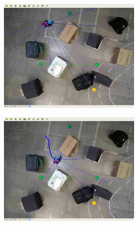 \vspace{0.25cm}
\begin{figure}[H]
\caption{Imagens sequência do experimento no Turtlebot3 no segundo ambiente real}
    \begin{center}
    \begin{subfigure}[b]{0.60\textwidth}
        \begin{subfigure}[b]{0.24\textwidth}
            \includegraphics[width=\textwidth]{imagens/real_envs/real_env2_ddpg/1.png}
        \end{subfigure}
        \hfill
        \begin{subfigure}[b]{0.24\textwidth}
            \includegraphics[width=\textwidth]{imagens/real_envs/real_env2_ddpg/2.png}

\end{subfigure}
\end{subfigure}
\end{center}
\end{figure}
